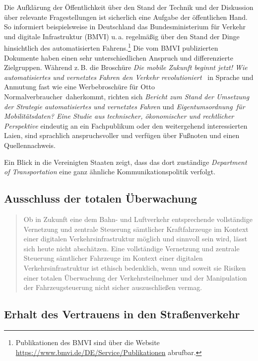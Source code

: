 \documentclass[twoside,a4paper,12pt]{article}
\begin{document}
Die Aufklärung der Öffentlichkeit über den Stand der Technik und der Diskussion über relevante Fragestellungen ist sicherlich eine Aufgabe der öffentlichen
Hand. 
So informiert beispielsweise in Deutschland das Bundesministerium für Verkehr und digitale Infrastruktur (BMVI) u.\,a. regelmäßig über den Stand der Dinge hinsichtlich
des automatisierten Fahrens.\footnote{Publikationen des BMVI sind über die Website \url{https://www.bmvi.de/DE/Service/Publikationen} abrufbar.} Die vom
BMVI publizierten Dokumente haben einen sehr unterschiedlichen Anspruch und differenzierte Zielgruppen. Während z.\,B. die Broschüre \textit{Die mobile 
Zukunft beginnt jetzt! Wie automatisiertes und vernetztes Fahren den Verkehr revolutioniert}~\cite{bmvi3} in Sprache und Anmutung fast wie eine Werbebroschüre 
für \glqq Otto Normalverbraucher\grqq\ daherkommt, richten sich \textit{Bericht zum Stand der Umsetzung der Strategie automatisiertes und vernetztes 
Fahren} und \textit{\glqq Eigentumsordnung\grqq\ für Mobilitätsdaten? Eine Studie aus technischer, ökonomischer und rechtlicher Perspektive} eindeutig an ein
Fachpublikum oder den weitergehend interessierten Laien, sind sprachlich anspruchsvoller und verfügen über Fußnoten und einen Quellennachweis.

Ein Blick in die Vereinigten Staaten zeigt, dass das dort zuständige \textit{Department of Transportation} eine ganz ähnliche Kommunikationspolitik
verfolgt.~\cite{dot}

\subsection{Ausschluss der totalen Überwachung} \label{AusschlussDerTotalenUeberwachung}

\begin{quote}
\glqq
Ob in Zukunft eine dem Bahn- und Luftverkehr entsprechende vollständige Vernetzung
und zentrale Steuerung sämtlicher Kraftfahrzeuge im Kontext einer digitalen Verkehrsinfrastruktur möglich und sinnvoll sein wird, 
lässt sich heute nicht abschätzen. Eine vollständige Vernetzung und zentrale Steuerung sämtlicher Fahrzeuge im Kontext einer 
digitalen Verkehrsinfrastruktur ist ethisch bedenklich, wenn und soweit sie Risiken einer totalen Überwachung der Verkehrsteilnehmer 
und der Manipulation der Fahrzeugsteuerung nicht sicher auszuschließen vermag.\grqq\mbox{~\cite[S. 12]{ek}}
\end{quote}



\subsection{Erhalt des Vertrauens in den Straßenverkehr} \label{ErhaltDesVertrauensInDenStrassenverkehr}
\end{document}
